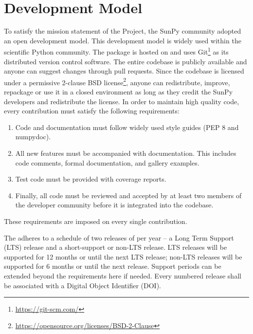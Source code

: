 \section{Development Model}
\label{sec:development}

To satisfy the mission statement of the Project, the SunPy community adopted an open development model.
This development model is widely used within the scientific Python community.
The \sunpypkg package is hosted on \github and uses Git\footnote{\url{https://git-scm.com/}} as its distributed version control software.
The entire codebase is publicly available and anyone can suggest changes through pull requests.
Since the codebase is licensed under a permissive 2-clause BSD license\footnote{\url{https://opensource.org/licenses/BSD-2-Clause}}, anyone can redistribute, improve, repackage or use it in a closed environment as long as they credit the SunPy developers and redistribute the license.
In order to maintain high quality code, every contribution must satisfy the following requirements:
\begin{enumerate}
    \item Code and documentation must follow widely used style guides (PEP 8 and numpydoc).
    \item All new features must be accompanied with documentation.
    This includes code comments, formal documentation, and gallery examples.
    \item Test code must be provided with coverage reports.
    \item Finally, all code must be reviewed and accepted by at least two members of the developer community before it is integrated into the codebase.
\end{enumerate}
These requirements are imposed on every single contribution.

The \sunpyproj adheres to a schedule of two releases of \sunpypkg per year -- a Long Term Support (LTS) release and a short-support or non-LTS release. 
LTS releases will be supported for 12 months or until the next LTS release; non-LTS releases will be supported for 6 months or until the next release. Support periods can be extended beyond the requirements here if needed.
Every numbered release shall be associated with a Digital Object Identifier (DOI).

